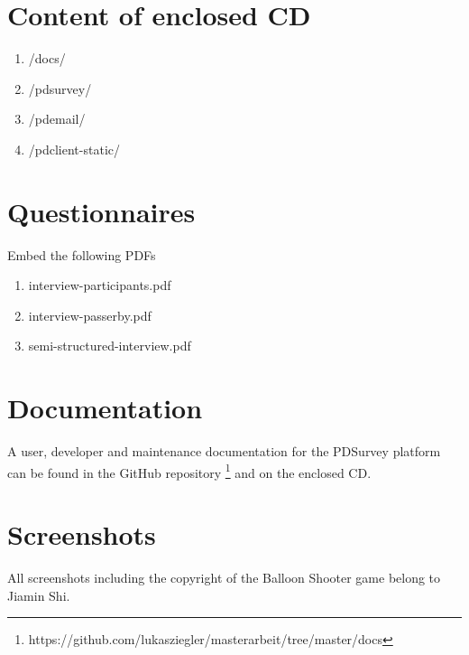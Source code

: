 \section{Content of enclosed CD}

  \begin{enumerate}
  \item /docs/
  \item /pdsurvey/
  \item /pdemail/
  \item /pdclient-static/
  \end{enumerate}




\section{Questionnaires}
  
  Embed the following PDFs

  \begin{enumerate}
  \item interview-participants.pdf
  \item interview-passerby.pdf
  \item semi-structured-interview.pdf
  \end{enumerate}



\section{Documentation}

  A user, developer and maintenance documentation for the PDSurvey platform can be found in the GitHub repository \footnote{https://github.com/lukasziegler/masterarbeit/tree/master/docs} and on the enclosed CD.




\section{Screenshots}
    \label{appendix:screenshots-balloon-shooter}

    All screenshots including the copyright of the Balloon Shooter game belong to Jiamin Shi. 
    
